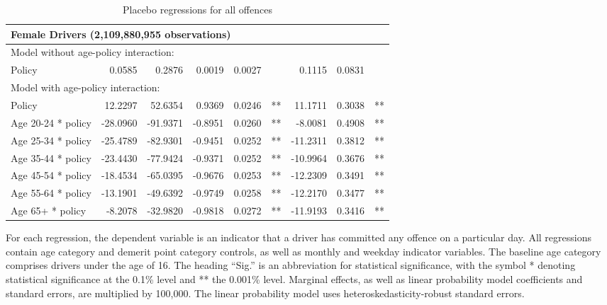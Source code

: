 \begin{table}
\begin{tabular}{l r r r r l r r l}
\hline 

\multicolumn{8}{l}{\textbf{Female Drivers} (2,109,880,955  observations)} \\ 

\hline
\multicolumn{8}{l}{Model without age-policy interaction: } \\ 
Policy                   &  0.0585        &  0.2876       &  0.0019        &  0.0027       &            &  0.1115        &  0.0831       &            \\ 
\hline
\multicolumn{8}{l}{Model with age-policy interaction: } \\ 
Policy                   &  12.2297        &  52.6354       &  0.9369        &  0.0246       &   **       &  11.1711        &  0.3038       &   **       \\ 
Age 20-24 * policy   &  -28.0960        &  -91.9371       &  -0.8951        &  0.0260       &   **       &  -8.0081        &  0.4908       &   **       \\ 
Age 25-34 * policy   &  -25.4789        &  -82.9301       &  -0.9451        &  0.0252       &   **       &  -11.2311        &  0.3812       &   **       \\ 
Age 35-44 * policy   &  -23.4430        &  -77.9424       &  -0.9371        &  0.0252       &   **       &  -10.9964        &  0.3676       &   **       \\ 
Age 45-54 * policy   &  -18.4534        &  -65.0395       &  -0.9676        &  0.0253       &   **       &  -12.2309        &  0.3491       &   **       \\ 
Age 55-64 * policy   &  -13.1901        &  -49.6392       &  -0.9749        &  0.0258       &   **       &  -12.2170        &  0.3477       &   **       \\ 
Age 65+ * policy   &  -8.2078        &  -32.9820       &  -0.9818        &  0.0272       &   **       &  -11.9193        &  0.3416       &   **       \\ 

\hline 

\end{tabular} 
\caption{Placebo regressions for all offences} 
For each regression, the dependent variable is an indicator that a driver has committed  
any offence on a particular day.  
All regressions contain age category and demerit point category controls, 
as well as monthly and weekday indicator variables. 
The baseline age category comprises drivers under the age of 16. 
The heading ``Sig.'' is an abbreviation for statistical significance, with 
the symbol * denoting statistical significance at the 0.1\% level 
and ** the 0.001\% level. 
Marginal effects, as well as linear probability model coefficients and standard errors, are  
multiplied by 100,000.  
The linear probability model uses heteroskedasticity-robust standard errors. 
\label{tab:seas_Logit_vs_LPMx100K_placebo_regs} 
\end{table} 
 
